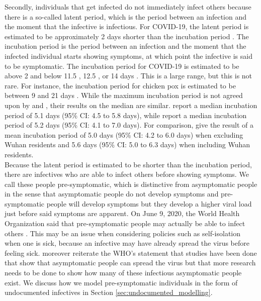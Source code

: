 \documentclass[12pt]{article}
\begin{document}
	Secondly, individuals that get infected do not immediately infect others because there is a so-called latent period, which is the period between an infection and the moment that the infective is infectious. For COVID-19, the latent period is estimated to be approximately 2 days shorter than the incubation period \parencite{he2020temporal}. The incubation period is the period between an infection and the moment that the infected individual starts showing symptoms, at which point the infective is said to be symptomatic. The incubation period for COVID-19 is estimated to be above 2 and below 11.5 \parencite{lauer2020incubation}, 12.5 \parencite{li2020incubation}, or 14 days \parencite{linton2020incubation}. This is a large range, but this is not rare. For instance, the incubation period for chicken pox is estimated to be between 9 and 21 days \parencite{papadopoulos2018chickenpox}. While the maximum incubation period is not agreed upon by \textcite{lauer2020incubation} and \textcite{li2020incubation}, their results on the median are similar. \textcite{lauer2020incubation} report a median incubation period of 5.1 days (95\% CI: 4.5 to 5.8 days), while \textcite{li2020incubation} report a median incubation period of 5.2 days (95\% CI: 4.1 to 7.0 days). For comparison, \textcite{linton2020incubation} give the result of a mean incubation period of 5.0 days (95\% CI: 4.2 to 6.0 days) when excluding Wuhan residents and 5.6 days (95\% CI: 5.0 to 6.3 days) when including Wuhan residents. \\
	
	Because the latent period is estimated to be shorter than the incubation period, there are infectives who are able to infect others before showing symptoms. We call these people pre-symptomatic, which is distinctive from asymptomatic people in the sense that asymptomatic people do not develop symptoms and pre-symptomatic people will develop symptoms but they develop a higher viral load just before said symptoms are apparent. On June 9, 2020, the World Health Organization said that pre-symptomatic people may actually be able to infect others \parencite{bloomberg2020AsymptomaticSpread}. This may be an issue when considering policies such as self-isolation when one is sick, because an infective may have already spread the virus before feeling sick. \textcite{bloomberg2020AsymptomaticSpread} moreover reiterate the WHO's statement that studies have been done that show that asymptomatic people can spread the virus but that more research needs to be done to show how many of these infectious asymptomatic people exist. We discuss how we model pre-symptomatic individuals in the form of undocumented infectives in Section \ref{sec:undocumented_modelling}. \\
	
\end{document}
